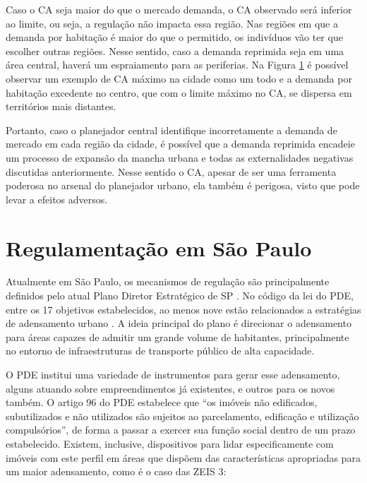 Caso o CA seja maior do que o mercado demanda, o CA observado será inferior ao limite, ou seja, a regulação não impacta essa região. Nas regiões em que a demanda por habitação é maior do que o permitido, os indivíduos vão ter que escolher outras regiões. Nesse sentido, caso a demanda reprimida seja em uma área central, haverá um espraiamento para as periferias. Na Figura \ref{fig:FAR} é possível observar um exemplo de CA máximo na cidade como um todo e a demanda por habitação excedente no centro, que com o limite máximo no CA, se dispersa em territórios mais distantes.

\begin{figure}[h]
    \caption{Impacto da regulação no CA da cidade}
    \centering
    \begin{subfigure}{.6\linewidth}
        
    \end{subfigure}
    \label{fig:FAR}
\end{figure}

Portanto, caso o planejador central identifique incorretamente a demanda de mercado em cada região da cidade, é possível que a demanda reprimida encadeie um processo de expansão da mancha urbana e todas as externalidades negativas discutidas anteriormente. Nesse sentido o CA, apesar de ser uma ferramenta poderosa no arsenal do planejador urbano, ela também é perigosa, visto que pode levar a efeitos adversos. 

\section{Regulamentação em São Paulo}

Atualmente em São Paulo, os mecanismos de regulação são principalmente definidos pelo atual Plano Diretor Estratégico de SP \cite[PDE]{PDE}. No código da lei do PDE, entre os 17 objetivos estabelecidos, ao menos nove estão relacionados a estratégias de adensamento urbano \cite{lima2021alem}. A ideia principal do plano é direcionar o adensamento para áreas capazes de admitir um grande volume de habitantes, principalmente no entorno de infraestruturas de transporte público de alta capacidade.

O PDE institui uma variedade de instrumentos para gerar esse adensamento, alguns atuando sobre empreendimentos já existentes, e outros para os novos também. O artigo 96 do PDE estabelece que ``os imóveis não edificados, subutilizados e não utilizados são sujeitos ao parcelamento, edificação e utilização compulsórios'', de forma a passar a exercer sua função social dentro de um prazo estabelecido. Existem, inclusive, dispositivos para lidar especificamente com imóveis com este perfil em áreas que dispõem das características apropriadas para um maior adensamento, como é o caso das ZEIS 3:


